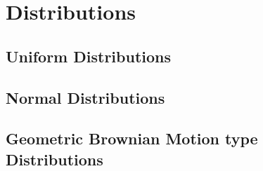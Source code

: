 \newpage
\chapter{Distributions}

\section{Uniform Distributions}


\section{Normal Distributions}


\section{Geometric Brownian Motion type Distributions}

